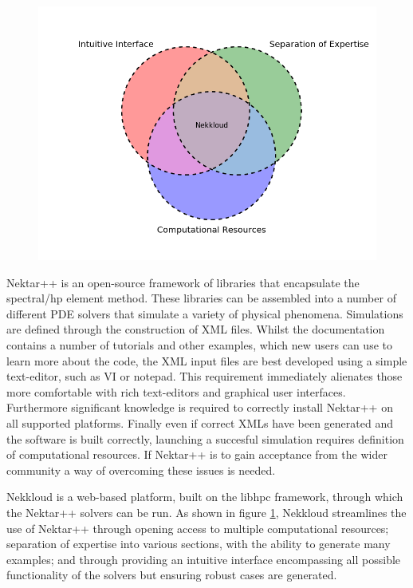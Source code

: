 \documentclass[11pt, a4paper]{report}
\begin{document}
\begin{figure}[htb!]
 \centering
 \includegraphics[width=.75\linewidth,  clip=true, trim = .4cm .4cm .4cm .4cm]{venn_diagram}
 \label{fig:venn_diagram}
\end{figure}

Nektar++\cite{Nektar2015} is an open-source framework of libraries that encapsulate the spectral/hp element method. These libraries can be assembled into a number of different PDE solvers that simulate a variety of physical phenomena. Simulations are defined through the construction of XML\cite{Solo_etal2002} files. Whilst the documentation contains a number of tutorials and other examples, which new users can use to learn more about the code, the XML input files are best developed using a simple text-editor, such as VI or notepad. This requirement immediately alienates those more comfortable with rich text-editors and graphical user interfaces. Furthermore significant knowledge is required to correctly install Nektar++ on all supported platforms. Finally even if correct XMLs have been generated and the software is built correctly, launching a succesful simulation requires definition of computational resources. If Nektar++ is to gain acceptance from the wider community a way of overcoming these issues is needed.

Nekkloud\cite{Cohen_etal2013} is a web-based platform, built on the libhpc framework, through which the Nektar++ solvers can be run. As shown in figure \ref{fig:venn_diagram}, Nekkloud streamlines the use of Nektar++ through opening access to multiple computational resources; separation of expertise into various sections, with the ability to generate many examples; and through providing an intuitive interface encompassing all possible functionality of the solvers but ensuring robust cases are generated.
\end{document}

